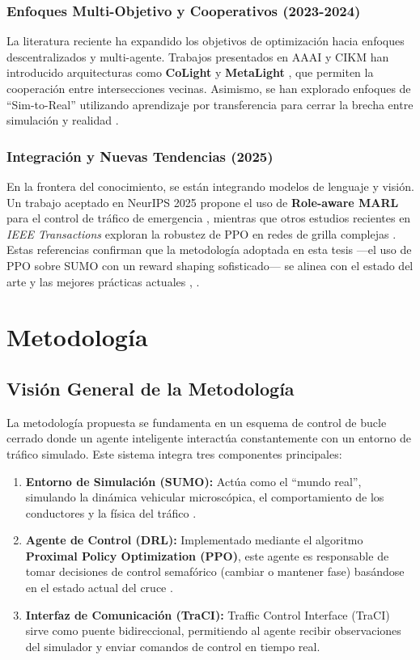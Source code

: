 \documentclass[12pt, a4paper]{report}
\begin{document}
\subsection{Enfoques Multi-Objetivo y Cooperativos (2023-2024)}
La literatura reciente ha expandido los objetivos de optimización hacia enfoques descentralizados y multi-agente. Trabajos presentados en AAAI y CIKM han introducido arquitecturas como \textbf{CoLight} \cite{12} y \textbf{MetaLight} \cite{10}, que permiten la cooperación entre intersecciones vecinas. Asimismo, se han explorado enfoques de ``Sim-to-Real'' utilizando aprendizaje por transferencia para cerrar la brecha entre simulación y realidad \cite{14}.

\subsection{Integración y Nuevas Tendencias (2025)}
En la frontera del conocimiento, se están integrando modelos de lenguaje y visión. Un trabajo aceptado en NeurIPS 2025 propone el uso de \textbf{Role-aware MARL} para el control de tráfico de emergencia \cite{15}, mientras que otros estudios recientes en \textit{IEEE Transactions} exploran la robustez de PPO en redes de grilla complejas \cite{48}. Estas referencias confirman que la metodología adoptada en esta tesis —el uso de PPO sobre SUMO con un reward shaping sofisticado— se alinea con el estado del arte y las mejores prácticas actuales \cite{1}, \cite{2}.

\chapter{Metodología}

\section{Visión General de la Metodología}
La metodología propuesta se fundamenta en un esquema de control de bucle cerrado donde un agente inteligente interactúa constantemente con un entorno de tráfico simulado. Este sistema integra tres componentes principales:

\begin{enumerate}
    \item \textbf{Entorno de Simulación (SUMO):} Actúa como el ``mundo real'', simulando la dinámica vehicular microscópica, el comportamiento de los conductores y la física del tráfico \cite{49}.
    \item \textbf{Agente de Control (DRL):} Implementado mediante el algoritmo \textbf{Proximal Policy Optimization (PPO)}, este agente es responsable de tomar decisiones de control semafórico (cambiar o mantener fase) basándose en el estado actual del cruce \cite{37}.
    \item \textbf{Interfaz de Comunicación (TraCI):} Traffic Control Interface (TraCI) sirve como puente bidireccional, permitiendo al agente recibir observaciones del simulador y enviar comandos de control en tiempo real.
\end{enumerate}
\end{document}
